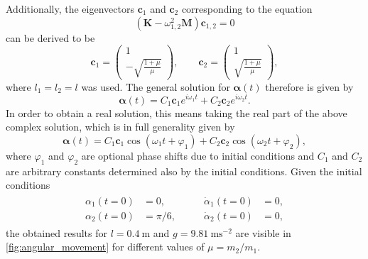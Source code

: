\documentclass{report}
\numberwithin{tm}{section}
\newcommand\matr[1]{\ensuremath{\boldsymbol{\mathbf{#1}}}}
\newcommand\vect[1]{\ensuremath{\bm{#1}}}
\begin{document}
Additionally, the eigenvectors $\vect{c}_1$ and $\vect{c}_2$ corresponding to the equation \begin{equation}
	\left(\matr{K}-\omega_{1,2}^2\matr{M}\right)\vect{c}_{1,2} = 0
\end{equation} can be derived to be \begin{equation}
\vect{c}_1 = \begin{pmatrix}
	1 \\ -\sqrt{\frac{1+\mu}{\mu}}
	\end{pmatrix}, \qquad \vect{c}_2 =\begin{pmatrix} 1 \\ \sqrt{\frac{1+\mu}{\mu}}
\end{pmatrix},
\end{equation} where $l_1=l_2 = l$ was used. The general solution for $\vect{\alpha}(t)$ therefore is given by \begin{equation}
\vect{\alpha}(t) = C_1\vect{c}_1e^{i\omega_1 t} + C_2\vect{c}_2e^{i\omega_2 t}.
\end{equation} In order to obtain a real solution, this means taking the real part of the above complex solution, which is in full generality given by \begin{equation}
\vect{\alpha}(t) = C_1\vect{c}_1 \cos(\omega_1 t + \varphi_1) + C_2\vect{c}_2\cos(\omega_2 t + \varphi_2),
\end{equation} where $\varphi_1$ and $\varphi_2$ are optional phase shifts due to initial conditions and $C_1$ and $C_2$ are arbitrary constants determined also by the initial conditions. Given the initial conditions \begin{align}
\begin{aligned}
	\alpha_1(t=0) &= 0, \qquad &\dot{\alpha}_1(t=0) &= 0, \\
	\alpha_2(t=0) &= \pi/6, \qquad  &\dot{\alpha}_2(t=0) &= 0,
\end{aligned}
\end{align} the obtained results for $l = \SI{0.4}{\meter}$ and $g = \SI{9.81}{\meter\second^{-2}}$ are visible in \cref{fig:angular_movement} for different values of $\mu = m_2/m_1$.
\end{document}
